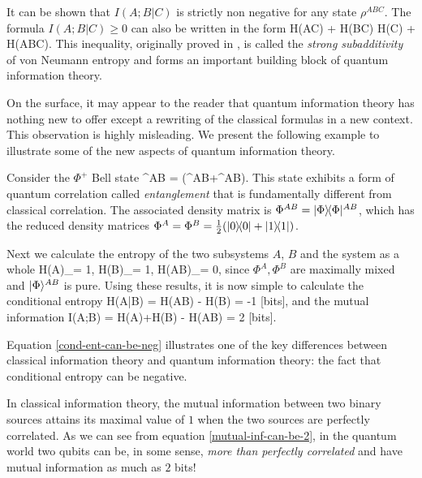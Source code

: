 \documentclass[aps,11pt,twoside,letterpaper]{article}
\begin{document}
			\noindent It can be shown that $I(A;B|C)$ is strictly non negative for any state $\rho^{ABC}$.
			The formula $I(A;B|C)\geq 0$ can also be written in the form
			\be	\label{strong-subadditivity}
				H(AC) + H(BC) 	\geq	H(C) + H(ABC).
			\ee
			This inequality, originally proved in \cite{LR73}, is called the \emph{strong subadditivity} of von Neumann 
			entropy and forms an important building block of quantum information theory.
			
			
			On the surface, it may appear to the reader that quantum information theory has nothing new to offer except 
			a rewriting of the classical formulas in a new context.
			This observation is highly misleading.
			We present the following example to illustrate some of the new aspects of quantum information theory.
			
			\begin{example}	\label{example:EPR-pair}
				Consider the $\Phi^{+}$\! Bell state 
				\be
					\ket{\Phi}^{AB} = (^{AB}+^{AB}).
				\ee
				This state exhibits a form of quantum correlation called \emph{entanglement} that is fundamentally
				different from classical correlation.
				The associated density matrix is $\Phi^{AB} = | \Phi \rangle\!\langle \Phi |^{AB}$, which has
				the reduced density matrices $\Phi^A = \Phi^B = \tfrac{1}{2}(| 0 \rangle\!\langle 0 | + | 1 \rangle\!\langle 1 |)$.
				
				Next we calculate the entropy of the two subsystems $A$, $B$ and the system as a whole 
				\be
					H(A)_\Phi = 1, 	\qquad
					H(B)_\Phi = 1, 	\qquad
					H(AB)_\Phi = 0,
				\ee
				since $\Phi^A,\Phi^B$ are maximally mixed and $| \Phi \rangle^{AB}$ is pure.
				Using these results, it is now simple to calculate the conditional entropy
				\be	\label{cond-ent-can-be-neg}
					H(A|B)	=	H(AB) - H(B)	= -1 \textup{ [bits]},
				\ee
				and the mutual information
				\be	\label{mutual-inf-can-be-2}
					I(A;B)	=	H(A)+H(B) - H(AB)	= 2 \textup{ [bits]}.
				\ee
			\end{example}
			
			Equation \eqref{cond-ent-can-be-neg} illustrates one of the key differences between classical information
			theory and quantum information theory: the fact that conditional entropy can be negative.
			
			In classical information theory, the mutual information between two binary sources attains its maximal value
			of $1$ when the two sources are perfectly correlated. As we can see from equation 
			\eqref{mutual-inf-can-be-2}, in the quantum world two qubits can be, in some sense,
			\emph{more than perfectly correlated} and have mutual information as much as $2$ bits!
			
\end{document}
